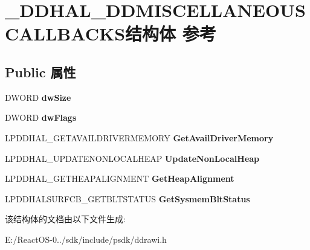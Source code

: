 \hypertarget{struct___d_d_h_a_l___d_d_m_i_s_c_e_l_l_a_n_e_o_u_s_c_a_l_l_b_a_c_k_s}{}\section{\+\_\+\+D\+D\+H\+A\+L\+\_\+\+D\+D\+M\+I\+S\+C\+E\+L\+L\+A\+N\+E\+O\+U\+S\+C\+A\+L\+L\+B\+A\+C\+K\+S结构体 参考}
\label{struct___d_d_h_a_l___d_d_m_i_s_c_e_l_l_a_n_e_o_u_s_c_a_l_l_b_a_c_k_s}
\subsection*{Public 属性}
\begin{DoxyCompactItemize}
\item 
\mbox{\label{struct___d_d_h_a_l___d_d_m_i_s_c_e_l_l_a_n_e_o_u_s_c_a_l_l_b_a_c_k_s_ac5c00952b9e88c15f9b229a6bed386c4}} 
D\+W\+O\+RD {\bfseries dw\+Size}
\item 
\mbox{\label{struct___d_d_h_a_l___d_d_m_i_s_c_e_l_l_a_n_e_o_u_s_c_a_l_l_b_a_c_k_s_ad5dc9bc888b84f59903b5e1dd32242bb}} 
D\+W\+O\+RD {\bfseries dw\+Flags}
\item 
\mbox{\label{struct___d_d_h_a_l___d_d_m_i_s_c_e_l_l_a_n_e_o_u_s_c_a_l_l_b_a_c_k_s_a51ec12418317b423f97d1de15fbf148c}} 
L\+P\+D\+D\+H\+A\+L\+\_\+\+G\+E\+T\+A\+V\+A\+I\+L\+D\+R\+I\+V\+E\+R\+M\+E\+M\+O\+RY {\bfseries Get\+Avail\+Driver\+Memory}
\item 
\mbox{\label{struct___d_d_h_a_l___d_d_m_i_s_c_e_l_l_a_n_e_o_u_s_c_a_l_l_b_a_c_k_s_a54540fd79fd41fbe885a46561df58015}} 
L\+P\+D\+D\+H\+A\+L\+\_\+\+U\+P\+D\+A\+T\+E\+N\+O\+N\+L\+O\+C\+A\+L\+H\+E\+AP {\bfseries Update\+Non\+Local\+Heap}
\item 
\mbox{\label{struct___d_d_h_a_l___d_d_m_i_s_c_e_l_l_a_n_e_o_u_s_c_a_l_l_b_a_c_k_s_a08ab9bd61445da81e7aa99de0aa80a69}} 
L\+P\+D\+D\+H\+A\+L\+\_\+\+G\+E\+T\+H\+E\+A\+P\+A\+L\+I\+G\+N\+M\+E\+NT {\bfseries Get\+Heap\+Alignment}
\item 
\mbox{\label{struct___d_d_h_a_l___d_d_m_i_s_c_e_l_l_a_n_e_o_u_s_c_a_l_l_b_a_c_k_s_a0648eb75c43c61d8f7dedb96e392c3d6}} 
L\+P\+D\+D\+H\+A\+L\+S\+U\+R\+F\+C\+B\+\_\+\+G\+E\+T\+B\+L\+T\+S\+T\+A\+T\+US {\bfseries Get\+Sysmem\+Blt\+Status}
\end{DoxyCompactItemize}


该结构体的文档由以下文件生成\+:\begin{DoxyCompactItemize}
\item 
E\+:/\+React\+O\+S-\/0../sdk/include/psdk/ddrawi.\+h\end{DoxyCompactItemize}
